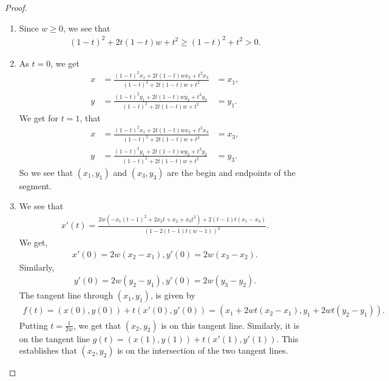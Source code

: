 \begin{proof}
    \begin{enumerate}
        \item Since $w\geq 0$, we see that
        \begin{align*}
            (1-t)^2 + 2t(1-t)w + t^2\geq (1-t)^2 + t^2 > 0.
        \end{align*}
        \item As $t=0$, we get
        \begin{align*}
            x & = \frac{(1-t)^2 x_1 + 2t(1-t)wx_2 + t^2 x_3}{(1-t)^2 + 2t(1-t)w + t^2} & = x_1,\\
            y & = \frac{(1-t)^2 y_1 + 2t(1-t)wy_2 + t^2 y_3}{(1-t)^2 + 2t(1-t)w + t^2} & = y_1.
        \end{align*}        
        We get for $t=1$, that
        \begin{align*}
            x & = \frac{(1-t)^2 x_1 + 2t(1-t)wx_2 + t^2 x_3}{(1-t)^2 + 2t(1-t)w + t^2} & = x_3,\\
            y & = \frac{(1-t)^2 y_1 + 2t(1-t)wy_2 + t^2 y_3}{(1-t)^2 + 2t(1-t)w + t^2} & = y_3. 
        \end{align*}     
        So we see that $(x_1,y_1)$ and $(x_3, y_3)$ are the begin and endpoints of the segment.
        \item We see that 
        \begin{align*}
            x'(t) 
            = \frac{2w(-x_1(t-1)^2 + 2x_2t + x_2 + x_3t^2) + 2(t-1)t(x_1 - x_3)}{(1 - 2(t-1)t(w-1))^2}.
        \end{align*}
        We get,
        \begin{align*}
            x'(0) 
            = 2w(x_2 - x_1),y'(0) 
            = 2w(x_3 - x_2).
        \end{align*}
        Similarly,
        \begin{align*}
            y'(0) 
            = 2w(y_2 - y_1),y'(0) 
            = 2w(y_3 - y_2).
        \end{align*}
        The tangent line through $(x_1, y_1)$, is given by
        \begin{align*}
            f(t) 
            = (x(0),y(0)) + t(x'(0),y'(0)) 
            = (x_1 + 2wt (x_2 - x_1), y_1 + 2wt(y_2 - y_1)).
        \end{align*}
        Putting $t= \frac{1}{2w}$, we get that $(x_2,y_2)$ is on this tangent line. 
        Similarly, it is on the tangent line $g(t) = (x(1),y(1)) + t(x'(1),y'(1))$. 
        This establishes that $(x_2,y_2)$ is on the intersection of the two tangent lines. 

\end{enumerate}
\end{proof}
